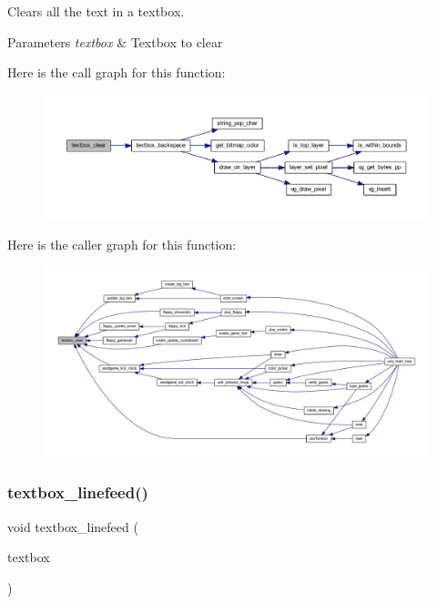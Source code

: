Clears all the text in a textbox. 


\begin{DoxyParams}{Parameters}
{\em textbox} & Textbox to clear \\
\hline
\end{DoxyParams}
Here is the call graph for this function\+:\nopagebreak
\begin{figure}[H]
\begin{center}
\leavevmode
\includegraphics[width=350pt]{group__textbox_gad6a37472eecd02e21570d33447c740e8_cgraph}
\end{center}
\end{figure}
Here is the caller graph for this function\+:\nopagebreak
\begin{figure}[H]
\begin{center}
\leavevmode
\includegraphics[width=350pt]{group__textbox_gad6a37472eecd02e21570d33447c740e8_icgraph}
\end{center}
\end{figure}
\mbox{\label{group__textbox_gae11fcc3afd300a03b3793eb4ec418207}} 
\subsubsection{\texorpdfstring{textbox\+\_\+linefeed()}{textbox\_linefeed()}}
{\footnotesize\ttfamily void textbox\+\_\+linefeed (\begin{DoxyParamCaption}\item[{\mbox{\hyperlink{struct_text_box}{Text\+Box}} $\ast$}]{textbox }\end{DoxyParamCaption})}



